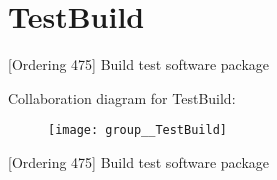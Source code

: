 \hypertarget{group__TestBuild}{\section{Test\-Build}
\label{group__TestBuild}
}


\mbox{[}Ordering 475\mbox{]} Build test software package  


Collaboration diagram for Test\-Build\-:\nopagebreak
\begin{figure}[H]
\begin{center}
\leavevmode
\texttt{[image: group\_\_TestBuild]}
\end{center}
\end{figure}
\mbox{[}Ordering 475\mbox{]} Build test software package 